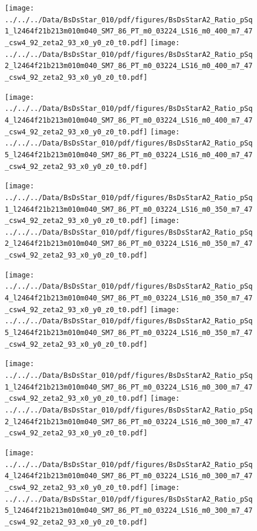 \documentclass[a4paper,10pt]{article}
\begin{document}
\begin{figure}[p]
 \texttt{[image: ../../../Data/BsDsStar\_010/pdf/figures/BsDsStarA2\_Ratio\_pSq1\_l2464f21b213m010m040\_SM7\_86\_PT\_m0\_03224\_LS16\_m0\_400\_m7\_47\_csw4\_92\_zeta2\_93\_x0\_y0\_z0\_t0.pdf]} 
 \texttt{[image: ../../../Data/BsDsStar\_010/pdf/figures/BsDsStarA2\_Ratio\_pSq2\_l2464f21b213m010m040\_SM7\_86\_PT\_m0\_03224\_LS16\_m0\_400\_m7\_47\_csw4\_92\_zeta2\_93\_x0\_y0\_z0\_t0.pdf]} 
 \end{figure}
\begin{figure}[p]
 \texttt{[image: ../../../Data/BsDsStar\_010/pdf/figures/BsDsStarA2\_Ratio\_pSq4\_l2464f21b213m010m040\_SM7\_86\_PT\_m0\_03224\_LS16\_m0\_400\_m7\_47\_csw4\_92\_zeta2\_93\_x0\_y0\_z0\_t0.pdf]} 
 \texttt{[image: ../../../Data/BsDsStar\_010/pdf/figures/BsDsStarA2\_Ratio\_pSq5\_l2464f21b213m010m040\_SM7\_86\_PT\_m0\_03224\_LS16\_m0\_400\_m7\_47\_csw4\_92\_zeta2\_93\_x0\_y0\_z0\_t0.pdf]} 
 \end{figure}
\begin{figure}[p]
 \texttt{[image: ../../../Data/BsDsStar\_010/pdf/figures/BsDsStarA2\_Ratio\_pSq1\_l2464f21b213m010m040\_SM7\_86\_PT\_m0\_03224\_LS16\_m0\_350\_m7\_47\_csw4\_92\_zeta2\_93\_x0\_y0\_z0\_t0.pdf]} 
 \texttt{[image: ../../../Data/BsDsStar\_010/pdf/figures/BsDsStarA2\_Ratio\_pSq2\_l2464f21b213m010m040\_SM7\_86\_PT\_m0\_03224\_LS16\_m0\_350\_m7\_47\_csw4\_92\_zeta2\_93\_x0\_y0\_z0\_t0.pdf]} 
 \end{figure}
\clearpage
\begin{figure}[p]
 \texttt{[image: ../../../Data/BsDsStar\_010/pdf/figures/BsDsStarA2\_Ratio\_pSq4\_l2464f21b213m010m040\_SM7\_86\_PT\_m0\_03224\_LS16\_m0\_350\_m7\_47\_csw4\_92\_zeta2\_93\_x0\_y0\_z0\_t0.pdf]} 
 \texttt{[image: ../../../Data/BsDsStar\_010/pdf/figures/BsDsStarA2\_Ratio\_pSq5\_l2464f21b213m010m040\_SM7\_86\_PT\_m0\_03224\_LS16\_m0\_350\_m7\_47\_csw4\_92\_zeta2\_93\_x0\_y0\_z0\_t0.pdf]} 
 \end{figure}
\begin{figure}[p]
 \texttt{[image: ../../../Data/BsDsStar\_010/pdf/figures/BsDsStarA2\_Ratio\_pSq1\_l2464f21b213m010m040\_SM7\_86\_PT\_m0\_03224\_LS16\_m0\_300\_m7\_47\_csw4\_92\_zeta2\_93\_x0\_y0\_z0\_t0.pdf]} 
 \texttt{[image: ../../../Data/BsDsStar\_010/pdf/figures/BsDsStarA2\_Ratio\_pSq2\_l2464f21b213m010m040\_SM7\_86\_PT\_m0\_03224\_LS16\_m0\_300\_m7\_47\_csw4\_92\_zeta2\_93\_x0\_y0\_z0\_t0.pdf]} 
 \end{figure}
\begin{figure}[p]
 \texttt{[image: ../../../Data/BsDsStar\_010/pdf/figures/BsDsStarA2\_Ratio\_pSq4\_l2464f21b213m010m040\_SM7\_86\_PT\_m0\_03224\_LS16\_m0\_300\_m7\_47\_csw4\_92\_zeta2\_93\_x0\_y0\_z0\_t0.pdf]} 
 \texttt{[image: ../../../Data/BsDsStar\_010/pdf/figures/BsDsStarA2\_Ratio\_pSq5\_l2464f21b213m010m040\_SM7\_86\_PT\_m0\_03224\_LS16\_m0\_300\_m7\_47\_csw4\_92\_zeta2\_93\_x0\_y0\_z0\_t0.pdf]} 
 \end{figure}
\clearpage
\clearpage
\end{document}
